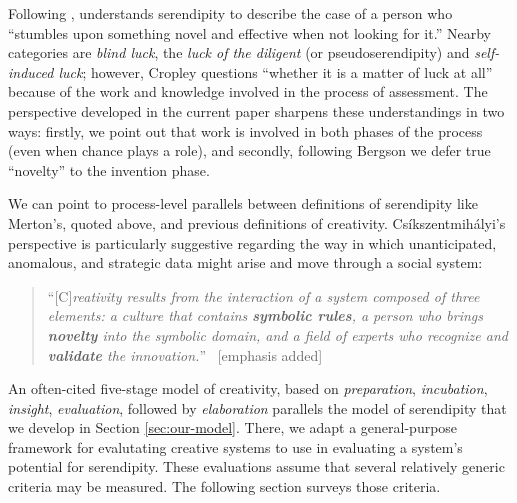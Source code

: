 Following ,  understands serendipity to
describe the case of a person who ``stumbles upon something novel and
effective when not looking for it.''  Nearby categories are
\emph{blind luck}, the \emph{luck of the diligent} (or
pseudoserendipity) and \emph{self-induced luck}; however, Cropley
questions ``whether it is a matter of luck at all'' because of the
work and knowledge involved in the process of assessment.
%
The perspective developed in the current paper sharpens these
understandings in two ways: firstly, we point out that work is
involved in both phases of the process (even when chance plays a
role), and secondly, following Bergson we defer true ``novelty'' to
the invention phase.


We can point to process-level parallels between definitions of
serendipity like Merton's, quoted above, and previous definitions of
creativity.  Cs\'ikszentmih\'alyi's perspective is particularly
suggestive regarding the way in which unanticipated, anomalous, and
strategic data might arise and move through a social system:
\begin{quote}
``{[}C{]}\emph{reativity results from the interaction of a system
    composed of three elements: a culture that contains 
   \emph{\textbf{symbolic rules}}, a person who brings 
    \emph{\textbf{novelty}} into the symbolic domain, and a
    field of experts who recognize and 
    \emph{\textbf{validate}} the innovation.}''
  \cite[p.~6]{csikszentmihalyi1997flow}~{[}emphasis added{]}
\end{quote}

An often-cited five-stage model of creativity, based on
\emph{preparation}, \emph{incubation}, \emph{insight},
\emph{evaluation}, followed by \emph{elaboration}  parallels the
model of serendipity that we develop in Section \ref{sec:our-model}.
There, we adapt a general-purpose framework for evalutating creative
systems \cite{jordanous:12} to use in evaluating a system's potential
for serendipity.  These evaluations assume that several relatively
generic criteria may be measured.  The following section surveys those
criteria.
 
